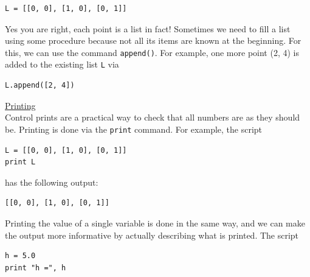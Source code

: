 \begin{bbox}
\begin{verbatim}
L = [[0, 0], [1, 0], [0, 1]]
\end{verbatim}
\end{bbox} 
\vspace{6mm}

\noindent
Yes you are right, each point is a list in fact! Sometimes we need to fill 
a list using some procedure because not all its items are known at the
beginning. For this, we can use the command {\tt append()}. For example,
one more point (2, 4) is added to the existing list {\tt L} via\\

\begin{bbox}
\begin{verbatim}
L.append([2, 4])
\end{verbatim}
\end{bbox} 
\vspace{6mm}

\noindent
\underline{Printing}\\

\noindent
Control prints are a practical way to check that all numbers are as they should be.
Printing is done via the {\tt print} command. For example, the script\\

\begin{bbox}
\begin{verbatim}
L = [[0, 0], [1, 0], [0, 1]]
print L
\end{verbatim}
\end{bbox} 
\vspace{6mm}

\noindent
has the following output:\\

\begin{bbox}
\begin{verbatim}
[[0, 0], [1, 0], [0, 1]]
\end{verbatim}
\end{bbox} 
\vspace{6mm}

\noindent
Printing the value of a single variable is done in the same way, and we can 
make the output more informative by actually describing what is printed.
The script\\

\begin{bbox}
\begin{verbatim}
h = 5.0
print "h =", h
\end{verbatim}
\end{bbox} 
\vspace{6mm}

